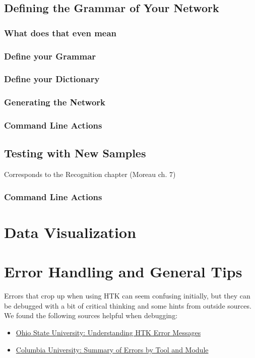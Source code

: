 \documentclass{wileySev}
\begin{document}
\chapter{Defining the Grammar of Your Network}
\section{What does that even mean}
\section{Define your Grammar}
\section{Define your Dictionary}
\section{Generating the Network}
\section{Command Line Actions}

\chapter{Testing with New Samples}
Corresponds to the Recognition chapter (Moreau ch. 7)
\section{Command Line Actions}

\part{Data Visualization}

\part{Error Handling and General Tips}

Errors that crop up when using HTK can seem confusing initially, but they can be debugged with a bit of critical thinking and some hints from outside sources. We found the following sources helpful when debugging:
\begin{itemize}
\item \href{http://www.ling.ohio-state.edu/~bromberg/htk_problems.html}{Ohio State University: Understanding HTK Error Messages}
\item \href{http://www.ee.columbia.edu/~dpwe/LabROSA/doc/HTKBook21/node256.html}{Columbia University: Summary of Errors by Tool and Module}
\end{itemize}
\end{document}
